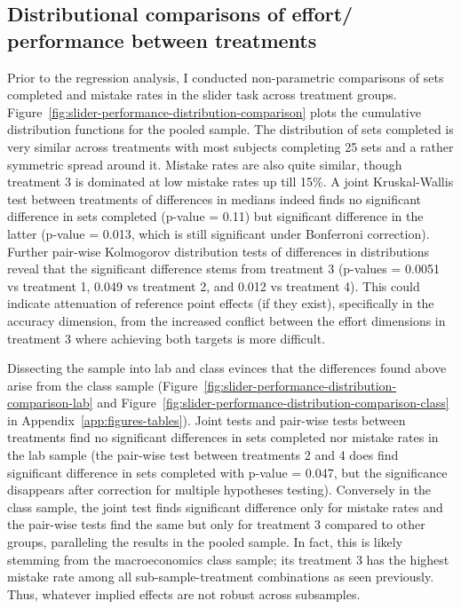 \documentclass[12pt, letterpaper]{article}
\begin{document}
\subsection{Distributional comparisons of effort/ performance between treatments}

Prior to the regression analysis, I conducted non-parametric comparisons of sets completed and mistake rates in the slider task across treatment groups. Figure~\ref{fig:slider-performance-distribution-comparison} plots the cumulative distribution functions for the pooled sample. The distribution of sets completed is very similar across treatments with most subjects completing 25 sets and a rather symmetric spread around it. Mistake rates are also quite similar, though treatment 3 is dominated at low mistake rates up till 15\%. A joint Kruskal-Wallis test between treatments of differences in medians indeed finds no significant difference in sets completed (p-value = 0.11) but significant difference in the latter (p-value = 0.013, which is still significant under Bonferroni correction). Further pair-wise Kolmogorov distribution tests of differences in distributions reveal that the significant difference stems from treatment 3 (p-values = 0.0051 vs treatment 1, 0.049 vs treatment 2, and 0.012 vs treatment 4). This could indicate attenuation of reference point effects (if they exist), specifically in the accuracy dimension, from the increased conflict between the effort dimensions in treatment 3 where achieving both targets is more difficult.

Dissecting the sample into lab and class evinces that the differences found above arise from the class sample (Figure~\ref{fig:slider-performance-distribution-comparison-lab} and Figure~\ref{fig:slider-performance-distribution-comparison-class} in Appendix~\ref{app:figures-tables}). Joint tests and pair-wise tests between treatments find no significant differences in sets completed nor mistake rates in the lab sample (the pair-wise test between treatments 2 and 4 does find significant difference in sets completed with p-value = 0.047, but the significance disappears after correction for multiple hypotheses testing). Conversely in the class sample, the joint test finds significant difference only for mistake rates and the pair-wise tests find the same but only for treatment 3 compared to other groups, paralleling the results in the pooled sample. In fact, this is likely stemming from the macroeconomics class sample; its treatment 3 has the highest mistake rate among all sub-sample-treatment combinations as seen previously. Thus, whatever implied effects are not robust across subsamples.
\end{document}
